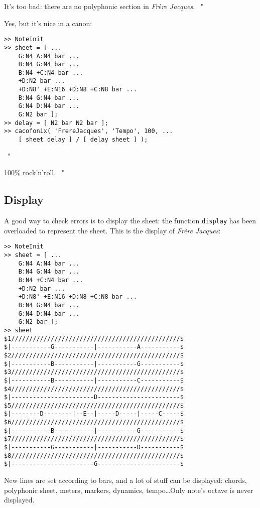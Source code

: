 \documentclass{article}
\newcommand\frerejaques{\emph{Fr\`ere Jacques}\xspace}
\newenvironment{meenv}{ \par \noindent \makebox[6em][r]{ \textcolor{mecolor}{Me}: " --~}}{~"}
\newenvironment{myselfenv}{ \par \noindent \makebox[6em][r]{ \textcolor{myselfcolor}{Myself}: " --~}}{~"}
\newcommand{ \me }[1]{%
\begin{meenv}%
	#1%
\end{meenv} }
\begin{document}
\begin{meenv}%
It's too bad: there are no polyphonic section in \frerejaques.%
\end{meenv}
\begin{myselfenv}%
Yes, but it's nice in a canon:

\begin{lstlisting}
>> NoteInit
>> sheet = [ ...
	G:N4 A:N4 bar ...
	B:N4 G:N4 bar ...
	B:N4 +C:N4 bar ...
	+D:N2 bar ...
	+D:N8' +E:N16 +D:N8 +C:N8 bar ...
	B:N4 G:N4 bar ...
	G:N4 D:N4 bar ...
	G:N2 bar ];
>> delay = [ N2 bar N2 bar ];
>> cacofonix( 'FrereJacques', 'Tempo', 100, ...
	[ sheet delay ] / [ delay sheet ] );
\end{lstlisting}%
\end{myselfenv}
\me{100\% rock'n'roll.}

\subsection{Display}

A good way to check errors is to display the sheet: the function \lstinline!display! has been overloaded to represent the sheet. This is the display of \frerejaques:
\begin{lstlisting}
>> NoteInit
>> sheet = [ ...
	G:N4 A:N4 bar ...
	B:N4 G:N4 bar ...
	B:N4 +C:N4 bar ...
	+D:N2 bar ...
	+D:N8' +E:N16 +D:N8 +C:N8 bar ...
	B:N4 G:N4 bar ...
	G:N4 D:N4 bar ...
	G:N2 bar ];
>> sheet
$1///////////////////////////////////////////////$
$|-----------G-----------|-----------A-----------$
$2///////////////////////////////////////////////$
$|-----------B-----------|-----------G-----------$
$3///////////////////////////////////////////////$
$|-----------B-----------|-----------C-----------$
$4///////////////////////////////////////////////$
$|-----------------------D-----------------------$
$5///////////////////////////////////////////////$
$|--------D--------|--E--|-----D-----|-----C-----$
$6///////////////////////////////////////////////$
$|-----------B-----------|-----------G-----------$
$7///////////////////////////////////////////////$
$|-----------G-----------|-----------D-----------$
$8///////////////////////////////////////////////$
$|-----------------------G-----------------------$
\end{lstlisting}

New lines are set according to bars, and a lot of stuff can be displayed: chords, polyphonic sheet, meters, markers, dynamics, tempo\dots Only note's octave is never displayed.
\end{document}
